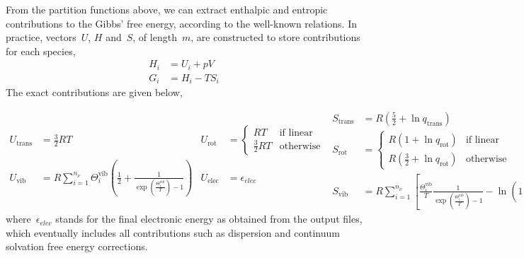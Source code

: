 From the partition functions above,
we can extract enthalpic and entropic contributions to the Gibbs' free energy,
according to the well-known relations.
In practice,
vectors~$U$,
$H$ and~$S$,
of length~$m$,
are constructed to store contributions for each species,
%
\begin{equation}
	\begin{split}
		H_i &= U_i + p V \\
		G_i & = H_i - T S_i
	\end{split}
\end{equation}
%
The exact contributions are given below,

\begin{subequations}
	\begin{align}
		U_\text{trans}
		 & = \frac{3}{2} R T
		 & U_\text{rot}
		 & = \begin{cases}
			     R T             & \text{if linear} \\
			     \frac{3}{2} R T & \text{otherwise}
		     \end{cases} \\
		U_\text{vib}
		 & = R \sum_{i = 1}^{n_\nu}
		\Theta^\text{vib}_i
		\left(
		\frac{1}{2}
		+ \frac{1}{
			\exp \left( \frac{\Theta^\text{vib}_i}{T}\right)
			- 1
		}
		\right)
		 & U_\text{elec}
		 & = \epsilon_{elec}
	\end{align}
	\begin{align}
		S_\text{trans}
		 & = R \left(
		\frac{5}{2}
		+ \ln{q_\text{trans}}
		\right)
		 & S_\text{elec}
		 & = R \ln{q_\text{elec}}                           \\
		S_\text{rot}
		 & = \begin{cases}
			     R \left(
			     1
			     + \ln{q_\text{rot}}
			     \right) & \text{if linear} \\
			     R \left(
			     \frac{3}{2}
			     + \ln{q_\text{rot}}
			     \right) & \text{otherwise}
		     \end{cases} \\
		S_\text{vib}
		 & = R \sum_{i = 1}^{n_\nu}
		\left[
			\frac{
				\Theta^\text{vib}_i
			}{T}
			\frac{1}{
				\exp \left( \frac{\Theta^\text{vib}_i}{T}\right)
				- 1
			}
			- \ln{\left(
				1
				- \exp \left( - \frac{\Theta^\text{vib}_i}{T}\right)
				\right)}
			\right]
	\end{align}
\end{subequations}
%
where~$\epsilon_{elec}$ stands for the final electronic energy as obtained from the output files,
which eventually includes all contributions such as dispersion and continuum solvation free energy corrections.

